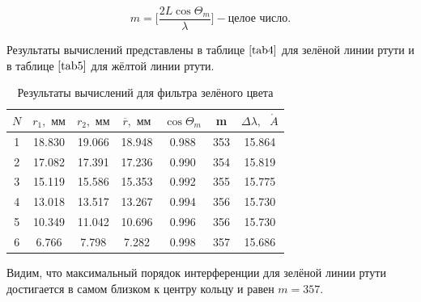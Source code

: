 \documentclass[a4paper,12pt]{article} %
\begin{document}
\begin{enumerate}
\begin{enumerate}
        \[ m = \biggl[\frac{2L\cos{\Theta_m}}{\lambda}\bigg] - \text{целое число}.\]

        Результаты вычислений представлены в таблице $\ref{tab4}$ для зелёной линии ртути и в таблице $\ref{tab5}$ для жёлтой линии ртути.

    \begin{table}[h]
        \centering
        \begin{tabular}{|c|c|c|c|c|c|c|}
        \hline
    	$N$ & $r_1, \text{ мм}$ & $r_2, \text{ мм}$ & $\overline{r}, \text{ мм}$ & $\cos{\Theta_m}$ & m & $\Delta\lambda, \text{ } \mathring A$ \\ \hline
    	1 & 18.830 & 19.066 & 18.948 & 0.988 & 353 & 15.864 \\ \hline
    	2 & 17.082 & 17.391 & 17.236 & 0.990 & 354 & 15.819 \\ \hline
    	3 & 15.119 & 15.586 & 15.353 & 0.992 & 355 & 15.775 \\ \hline
    	4 & 13.018 & 13.517 & 13.267 & 0.994 & 356 & 15.730 \\ \hline
    	5 & 10.349 & 11.042 & 10.696 & 0.996 & 356 & 15.730 \\ \hline
    	6 & 6.766 & 7.798 & 7.282 & 0.998 & 357 & 15.686 \\ \hline
        \end{tabular}
    \caption{Результаты вычислений для фильтра зелёного цвета}
    \label{tab4}
    \end{table}

    Видим, что максимальный порядок интерференции для зелёной линии ртути достигается в самом близком к центру кольцу и равен $m = 357$.


\end{enumerate}
\end{enumerate}
\end{document}
